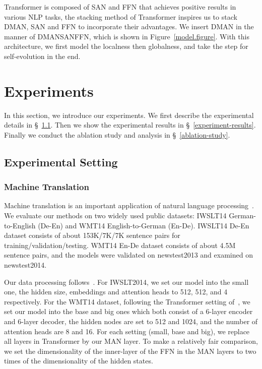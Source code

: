 \documentclass[11pt]{article}
\begin{document}
Transformer is composed of SAN and FFN that achieves positive results in various NLP tasks, the stacking method of Transformer inspires us to stack DMAN, SAN and FFN to incorporate their advantages. We insert DMAN in the manner of DMANSANFFN, which is shown in Figure~\ref{model.figure}. With this architecture, we first model the localness then globalness, and take the step for self-evolution in the end. 


\section{Experiments}
In this section, we introduce our experiments. We first describe the experimental details in \S~\ref{experiment-details}. Then we show the experimental results in \S~\ref{experiment-results}. Finally we conduct the ablation study and analysis in \S~\ref{ablation-study}.

\subsection{Experimental Setting}
\label{experiment-details}
\subsubsection{Machine Translation}
Machine translation is an important application of natural language processing~\cite{vaswani2017attention}. We evaluate our methods on two widely used public datasets: IWSLT14 German-to-English (De-En) and WMT14 English-to-German (En-De). IWSLT14 De-En dataset consists of about 153K/7K/7K sentence pairs for training/validation/testing. WMT14 En-De dataset consists of about 4.5M sentence pairs, and the models were validated on newstest2013 and examined on newstest2014.

Our data processing follows~\citet{lu2019understanding}. For IWSLT2014, we set our model into the small one, the hidden size, embeddings and attention heads to 512, 512, and 4 respectively. For the WMT14 dataset, following the Transformer setting of~\citet{vaswani2017attention}, we set our model into the base and big ones which both consist of a 6-layer encoder and 6-layer decoder, the hidden nodes are set to 512 and 1024, and the number of attention heads are 8 and 16. For each setting (small, base and big), we replace all layers in Transformer by our MAN layer. To make a relatively fair comparison, we set the dimensionality of the inner-layer of the FFN in the MAN layers to two times of the dimensionality of the hidden states.
\end{document}
